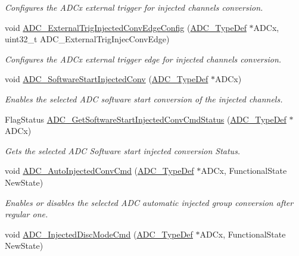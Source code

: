 \begin{DoxyCompactItemize}
\begin{DoxyCompactList}\small\item\em Configures the A\+D\+Cx external trigger for injected channels conversion. \end{DoxyCompactList}\item 
void \hyperlink{group___a_d_c___group6_ga62bea56579f04374fbe830d9e55e6fb0}{A\+D\+C\+\_\+\+External\+Trig\+Injected\+Conv\+Edge\+Config} (\hyperlink{struct_a_d_c___type_def}{A\+D\+C\+\_\+\+Type\+Def} $\ast$A\+D\+Cx, uint32\+\_\+t A\+D\+C\+\_\+\+External\+Trig\+Injec\+Conv\+Edge)
\begin{DoxyCompactList}\small\item\em Configures the A\+D\+Cx external trigger edge for injected channels conversion. \end{DoxyCompactList}\item 
void \hyperlink{group___a_d_c___group6_ga79b2f6c3c77925b35495f2db228895de}{A\+D\+C\+\_\+\+Software\+Start\+Injected\+Conv} (\hyperlink{struct_a_d_c___type_def}{A\+D\+C\+\_\+\+Type\+Def} $\ast$A\+D\+Cx)
\begin{DoxyCompactList}\small\item\em Enables the selected A\+DC software start conversion of the injected channels. \end{DoxyCompactList}\item 
Flag\+Status \hyperlink{group___a_d_c___group6_ga8765f8835b8cfed13dce3d8d71767dcc}{A\+D\+C\+\_\+\+Get\+Software\+Start\+Injected\+Conv\+Cmd\+Status} (\hyperlink{struct_a_d_c___type_def}{A\+D\+C\+\_\+\+Type\+Def} $\ast$A\+D\+Cx)
\begin{DoxyCompactList}\small\item\em Gets the selected A\+DC Software start injected conversion Status. \end{DoxyCompactList}\item 
void \hyperlink{group___a_d_c___group6_ga1ff9c3b8e4bbdd2addfd227f1a506a66}{A\+D\+C\+\_\+\+Auto\+Injected\+Conv\+Cmd} (\hyperlink{struct_a_d_c___type_def}{A\+D\+C\+\_\+\+Type\+Def} $\ast$A\+D\+Cx, Functional\+State New\+State)
\begin{DoxyCompactList}\small\item\em Enables or disables the selected A\+DC automatic injected group conversion after regular one. \end{DoxyCompactList}\item 
void \hyperlink{group___a_d_c___group6_ga0b583b94183fa4ff287177b9ee808092}{A\+D\+C\+\_\+\+Injected\+Disc\+Mode\+Cmd} (\hyperlink{struct_a_d_c___type_def}{A\+D\+C\+\_\+\+Type\+Def} $\ast$A\+D\+Cx, Functional\+State New\+State)

\end{DoxyCompactItemize}
